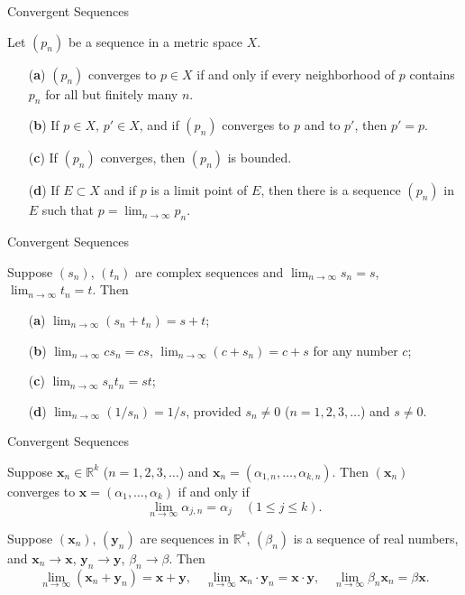 \documentclass{beamer}
\begin{document}
\begin{frame}{Convergent Sequences}
\begin{theorem}
Let $(p_n)$ be a sequence in a metric space $X$.
\begin{enumerate}
    \item[(\textbf{a})] $(p_n)$ converges to $p \in X$ if and only if every
    neighborhood of $p$ contains $p_n$ for all but finitely many $n$.
    \item[(\textbf{b})] If $p \in X$, $p' \in X$, and if $(p_n)$ converges to
    $p$ and to $p'$, then $p' = p$.
    \item[(\textbf{c})] If $(p_n)$ converges, then $(p_n)$ is bounded.
    \item[(\textbf{d})] If $E \subset X$ and if $p$ is a limit point of $E$,
    then there is a sequence $(p_n)$ in $E$ such that $p = \lim_{n \to \infty}
    p_n$.
\end{enumerate}
\end{theorem}
\end{frame}
\begin{frame}{Convergent Sequences}
\begin{theorem}
Suppose $(s_n)$, $(t_n)$ are complex sequences and $\lim_{n \to \infty} s_n =
s$, $\lim_{n \to \infty} t_n = t$. Then
\begin{enumerate}
    \item[(\textbf{a})] $\lim_{n \to \infty} (s_n + t_n) = s + t$;
    \item[(\textbf{b})] $\lim_{n \to \infty} c s_n = c s$, $\lim_{n \to \infty}
    (c + s_n) = c + s$ for any number $c$;
    \item[(\textbf{c})] $\lim_{n \to \infty} s_n t_n = s t$;
    \item[(\textbf{d})] $\lim_{n \to \infty} (1/s_n) = 1/s$, provided $s_n \neq
    0$ ($n = 1, 2, 3, \dotsc$) and $s \neq 0$.
\end{enumerate}
\end{theorem}
\end{frame}

\begin{frame}{Convergent Sequences}
\begin{theorem}[a]
Suppose $\mathbf{x}_n \in \mathbb{R}^k$ ($n = 1, 2, 3, \dotsc$) and
$\mathbf{x}_n = (\alpha_{1,n}, \dotsc, \alpha_{k,n})$. Then $(\mathbf{x}_n)$
converges to $\mathbf{x} = (\alpha_1, \dotsc, \alpha_k)$ if and only if
\begin{equation}
 \lim_{n \to \infty} \alpha_{j,n} = \alpha_j \quad (1 \leq j \leq k).
\end{equation}



Suppose $(\mathbf{x}_n)$, $(\mathbf{y}_n)$ are sequences in $\mathbb{R}^k$,
$(\beta_n)$ is a sequence of real numbers, and $\mathbf{x}_n \to \mathbf{x}$,
$\mathbf{y}_n \to \mathbf{y}$, $\beta_n \to \beta$. Then
\[
\lim_{n \to \infty} (\mathbf{x}_n + \mathbf{y}_n) = \mathbf{x} + \mathbf{y}, \quad 
\lim_{n \to \infty} \mathbf{x}_n \cdot \mathbf{y}_n = \mathbf{x} \cdot \mathbf{y}, \quad 
\lim_{n \to \infty} \beta_n \mathbf{x}_n = \beta \mathbf{x}.
\]
\end{theorem}
\end{frame}
\end{document}
